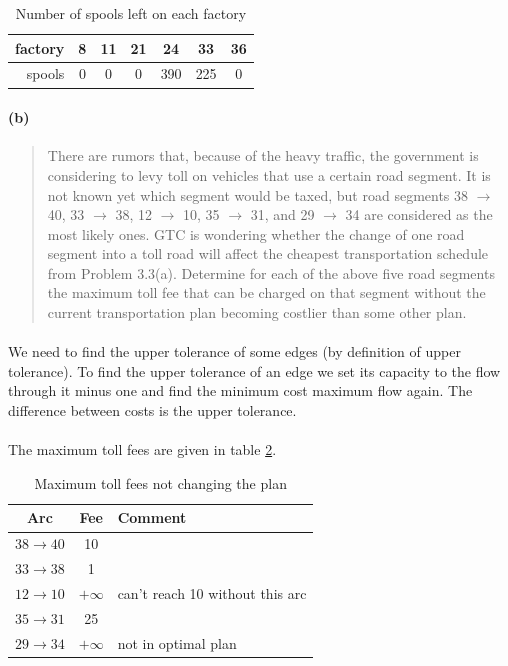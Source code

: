 \begin{table}[H]
\centering
\begin{tabular}{|r|c|c|c|c|c|c|}
\hline
factory & 8 & 11 & 21 & 24 & 33 & 36 \\ \hline
spools & 0 & 0 & 0 & 390 & 225 & 0   \\ \hline
\end{tabular}
\caption{Number of spools left on each factory}
\label{spools-left}
\end{table}

\paragraph{(b)}
\begin{quote}
There are rumors that, because of the heavy traffic, the government is considering to levy toll on vehicles that use a certain road segment. It is not known yet which segment would be taxed, but road segments 38 $\rightarrow$ 40, 33 $\rightarrow$ 38, 12 $\rightarrow$ 10, 35 $\rightarrow$ 31, and 29 $\rightarrow$ 34 are considered as the most likely ones.
GTC is wondering whether the change of one road segment into a toll road will affect the cheapest transportation schedule from Problem 3.3(a). Determine for each of the above five road segments the maximum toll fee that can be charged on that segment without the current transportation plan becoming costlier than some other plan.
\end{quote}

\paragraph{}
We need to find the upper tolerance of some edges (by definition of upper tolerance). To find the upper tolerance of an edge we set its capacity to the flow through it minus one and find the minimum cost maximum flow again. The difference between costs is the upper tolerance.

\paragraph{}
The maximum toll fees are given in table \ref{toll-fees}.

\begin{table}[H]
\centering
\begin{tabular}{|c|c|l|}
\hline
Arc & Fee & Comment \\ \hline
$ 38 \rightarrow 40 $ & 10 & \\ \hline
$ 33 \rightarrow 38 $ & 1 & \\ \hline
$ 12 \rightarrow 10 $ & $+\infty$ & can't reach 10 without this arc \\ \hline
$ 35 \rightarrow 31 $ & 25 & \\ \hline
$ 29 \rightarrow 34 $ & $+\infty$ & not in optimal plan \\ \hline
\end{tabular}
\caption{Maximum toll fees not changing the plan}
\label{toll-fees}
\end{table}


